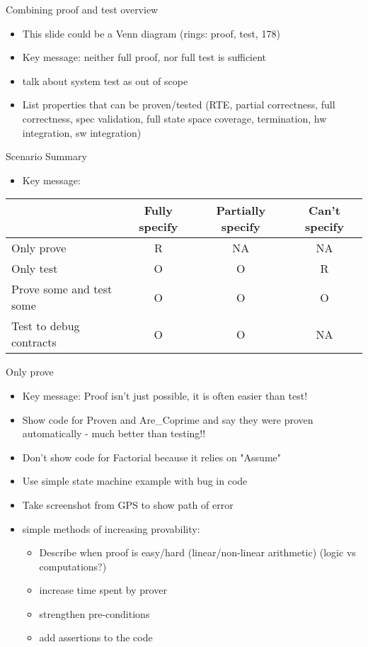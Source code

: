 \documentclass{beamer}
\begin{document}
\begin{frame}[fragile]{Combining proof and test overview}
  \begin{itemize}
     \item This slide could be a Venn diagram (rings: proof, test, 178)
     \item Key message: neither full proof, nor full test is sufficient
     \item talk about system test as out of scope
     \item List properties that can be proven/tested (RTE, partial correctness, full correctness, spec validation, full state space coverage, termination, hw integration, sw integration)
  \end{itemize}
\end{frame}

\begin{frame}[fragile]{Scenario Summary}
  \begin{itemize}
     \item Key message: 
  \end{itemize}
\begin{center}
\begin{tabular}{l | c | c | c}
    & Fully specify & Partially specify & Can't specify \\
  \hline
  Only prove & R & NA & NA \\
  Only test & O & O & R \\
  Prove some and test some & O & O & O \\
  Test to debug contracts & O & O & NA \\
\end{tabular}
\end{center}

\end{frame}

\begin{frame}[fragile]{Only prove}
  \begin{itemize}
     \item Key message: Proof isn't just possible, it is often easier than test!
     \item Show code for Proven and Are_Coprime and say they were proven automatically - much better than testing!!
     \item Don't show code for Factorial because it relies on "Assume"
     \item Use simple state machine example with bug in code 
     \item Take screenshot from GPS to show path of error 

     \item simple methods of increasing provability:
     \begin{itemize}
        \item Describe when proof is easy/hard (linear/non-linear arithmetic) (logic vs computations?)
        \item increase time spent by prover
        \item strengthen pre-conditions
        \item add assertions to the code
     \end{itemize}
  \end{itemize}
\end{frame}
\end{document}
